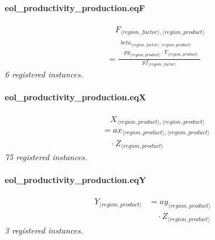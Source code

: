 \documentclass[11pt]{article}
\begin{document}
\paragraph{eol\_productivity\_production.eqF}
\begin{align*}
&\quad F_{\langle region, factor\rangle,\langle region, product\rangle}\\
&= \frac{\begin{aligned}
beta_{\langle region, factor\rangle,\langle region, product\rangle}\\
{}\cdot py_{\langle region, product\rangle} \cdot Y_{\langle region, product\rangle}
\end{aligned}}{pf_{\langle region, factor\rangle}}
\end{align*}
\noindent\emph{6 registered instances.}\par
\paragraph{eol\_productivity\_production.eqX}
\begin{align*}
&\quad X_{\langle region, product\rangle,\langle region, product\rangle}\\
&= ax_{\langle region, product\rangle,\langle region, product\rangle}\\
&\quad {}\cdot Z_{\langle region, product\rangle}
\end{align*}
\noindent\emph{75 registered instances.}\par
\paragraph{eol\_productivity\_production.eqY}
\begin{align*}
Y_{\langle region, product\rangle} &= ay_{\langle region, product\rangle}\\
&\quad {}\cdot Z_{\langle region, product\rangle}
\end{align*}
\noindent\emph{3 registered instances.}\par
\end{document}
